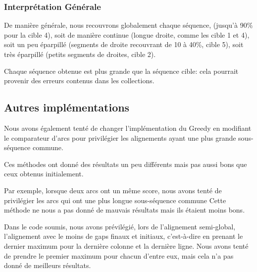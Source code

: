 \FloatBarrier


\subsubsection*{Interprétation Générale}

De manière générale, nous recouvrons globalement chaque séquence, (jusqu'à 90\%
pour la cible 4), soit de manière continue (longue droite, comme les cible 1 et
4), soit un peu éparpillé (segments de droite recouvrant de 10 à 40\%, cible 5),
soit très éparpillé (petits segments de droites, cible 2).

Chaque séquence obtenue est plus grande que la séquence cible: cela pourrait
provenir des erreurs contenus dans les collections.

\subsection{Autres implémentations}

Nous avons également tenté de changer l'implémentation du Greedy en modifiant
le comparateur d'arcs pour privilégier les alignements ayant une plus grande
sous-séquence commune.

Ces méthodes ont donné des résultats un peu différents mais pas aussi bons que
ceux obtenus initialement.

Par exemple, lorsque deux arcs ont un même score, nous avons tenté de
privilégier les arcs qui ont une plus longue sous-séquence commune Cette méthode
ne nous a pas donné de mauvais résultats mais ils étaient moins bons.

Dans le code soumis, nous avons prévilégié, lors de l'alignement semi-global,
l'alignement avec le moins de gaps finaux et initiaux, c'est-à-dire en
prenant le dernier maximum pour la dernière colonne et la dernière ligne. Nous
avons tenté de prendre le premier maximum pour chacun d'entre eux, mais cela n'a
pas donné de meilleurs résultats.

